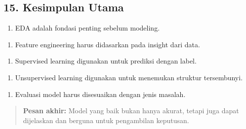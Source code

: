 \documentclass[12pt,a4paper]{article}
\begin{document}
\subsection{15. Kesimpulan Utama}

\begin{enumerate}
\item EDA adalah fondasi penting sebelum modeling.
\end{enumerate}

\begin{enumerate}
\item Feature engineering harus didasarkan pada insight dari data.
\end{enumerate}

\begin{enumerate}
\item Supervised learning digunakan untuk prediksi dengan label.
\end{enumerate}

\begin{enumerate}
\item Unsupervised learning digunakan untuk menemukan struktur tersembunyi.
\end{enumerate}

\begin{enumerate}
\item Evaluasi model harus disesuaikan dengan jenis masalah.
\end{enumerate}


\begin{quote}
\textbf{Pesan akhir:} Model yang baik bukan hanya akurat, tetapi juga dapat dijelaskan dan berguna untuk pengambilan keputusan.\end{quote}
\end{document}
